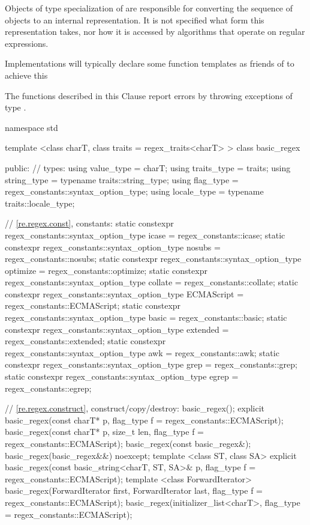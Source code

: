\pnum
Objects of type specialization of  are responsible for
converting the sequence of  objects to an internal
representation. It is not specified what form this representation
takes, nor how it is accessed by algorithms that operate on regular
expressions. \begin{note} Implementations will typically declare
some function templates as friends of  to achieve
this \end{note}

\pnum
{}%
The functions described in this Clause report errors by throwing
exceptions of type .

%
\begin{codeblock}
namespace std {
  template <class charT,
            class traits = regex_traits<charT> >
  class basic_regex {
  public:
    // types:
    using value_type  =          charT;
    using traits_type =          traits;
    using string_type = typename traits::string_type;
    using flag_type   =          regex_constants::syntax_option_type;
    using locale_type = typename traits::locale_type;

    // \ref{re.regex.const}, constants:
    static constexpr regex_constants::syntax_option_type
      icase = regex_constants::icase;
    static constexpr regex_constants::syntax_option_type
      nosubs = regex_constants::nosubs;
    static constexpr regex_constants::syntax_option_type
      optimize = regex_constants::optimize;
    static constexpr regex_constants::syntax_option_type
      collate = regex_constants::collate;
    static constexpr regex_constants::syntax_option_type
      ECMAScript = regex_constants::ECMAScript;
    static constexpr regex_constants::syntax_option_type
      basic = regex_constants::basic;
    static constexpr regex_constants::syntax_option_type
      extended = regex_constants::extended;
    static constexpr regex_constants::syntax_option_type
      awk = regex_constants::awk;
    static constexpr regex_constants::syntax_option_type
      grep = regex_constants::grep;
    static constexpr regex_constants::syntax_option_type
      egrep = regex_constants::egrep;

    // \ref{re.regex.construct}, construct/copy/destroy:
    basic_regex();
    explicit basic_regex(const charT* p,
      flag_type f = regex_constants::ECMAScript);
    basic_regex(const charT* p, size_t len, flag_type f = regex_constants::ECMAScript);
    basic_regex(const basic_regex&);
    basic_regex(basic_regex&&) noexcept;
    template <class ST, class SA>
      explicit basic_regex(const basic_string<charT, ST, SA>& p, 
                           flag_type f = regex_constants::ECMAScript);
    template <class ForwardIterator>
      basic_regex(ForwardIterator first, ForwardIterator last, 
                  flag_type f = regex_constants::ECMAScript);
    basic_regex(initializer_list<charT>,
      flag_type = regex_constants::ECMAScript);

}}
\end{codeblock}

